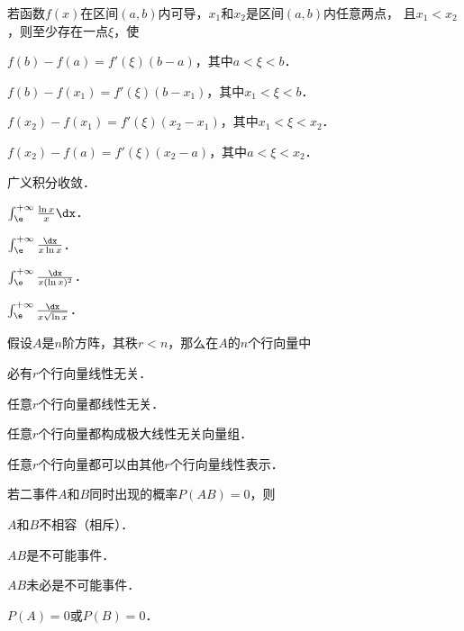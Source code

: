 \documentclass[plain,noanswer,medmath]{../../template/jnuexam}
\begin{document}
\begin{problem}
若函数$f(x)$在区间$(a,b)$内可导，$x_1$和$x_2$是区间$(a,b)$内任意两点，
且$x_1 < x_2$，则至少存在一点$\xi$，使\pickout{}
\begin{abcd}
\item $f(b) - f(a) = f'(\xi)(b - a)$，其中$a < \xi < b$．
\item $f(b) - f(x_1) = f'(\xi)(b - x_1)$，其中$x_1 < \xi < b$．
\item $f(x_2) - f(x_1) = f'(\xi)(x_2 - x_1)$，其中$x_1 < \xi < x_2$．
\item $f(x_2) - f(a) = f'(\xi)(x_2 - a)$，其中$a < \xi < x_2$．
\end{abcd}
\end{problem}


\begin{problem}
广义积分\pickin{}收敛．
\begin{abcd}
\item $\int_{\e}^{+\infty} \frac{\ln x}{x}\dx$．
\item $\int_{\e}^{+\infty} \frac{\dx}{x\ln x}$．
\item $\int_{\e}^{+\infty} \frac{\dx}{x(\ln x)^2}$．
\item $\int_{\e}^{+\infty} \frac{\dx}{x\sqrt{\ln x}}$．
\end{abcd}
\end{problem}


\begin{problem}
假设$A$是$n$阶方阵，其秩$r<n$，那么在$A$的$n$个行向量中\pickout{}
\begin{abcd}
\item 必有$r$个行向量线性无关．
\item 任意$r$个行向量都线性无关．
\item 任意$r$个行向量都构成极大线性无关向量组．
\item 任意$r$个行向量都可以由其他$r$个行向量线性表示．
\end{abcd}
\end{problem}


\begin{problem}
若二事件$A$和$B$同时出现的概率$P(AB)=0$，则\pickout{}
\begin{abcd}
\item $A$和$B$不相容（相斥）．
\item $AB$是不可能事件．
\item $AB$未必是不可能事件．
\item $P(A) = 0$或$P(B) = 0$．
\end{abcd}
\end{problem}
\end{document}
